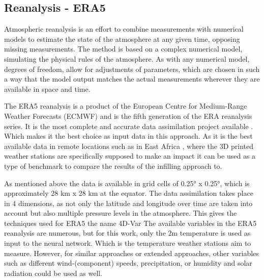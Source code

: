 \subsection{Reanalysis - ERA5}

Atmospheric reanalysis is an effort to combine measurements with numerical models to estimate the state of the atmosphere at any given time, opposing missing measurements. The method is based on a complex numerical model, simulating the physical rules of the atmosphere. As with any numerical model, degrees of freedom, allow for adjustments of parameters, which are chosen in such a way that the model output matches the actual measurements wherever they are available in space and time. 

The ERA5 reanalysis is a product of the European Centre for Medium-Range Weather Forecasts (ECMWF) and is the fifth generation of the ERA reanalysis series. It is the most complete and accurate data assimilation project available \cite{Hersbach2020ERA5quality}. Which makes it the best choice as input data in this approach. As it is the best available data in remote locations such as in East Africa \cite{Gleixner2020ERA5africa}, where the 3D printed weather stations are specifically supposed to make an impact it can be used as a type of benchmark to compare the results of the infilling approach to.

As mentioned above the data is available in grid cells of 0.25° x 0.25°, which is approximately 28 km x 28 km at the equator. The data assimilation takes place in 4 dimensions, as not only the latitude and longitude over time are taken into account but also multiple pressure levels in the atmosphere. This gives the techniques used for ERA5 the name 4D-Var \cite{era5}
The available variables in the ERA5 reanalysis are numerous, but for this work, only the 2m temperature is used as input to the neural network. Which is the temperature weather stations aim to measure. However, for similar approaches or extended approaches, other variables such as different wind-(component) speeds, precipitation, or humidity and solar radiation could be used as well.